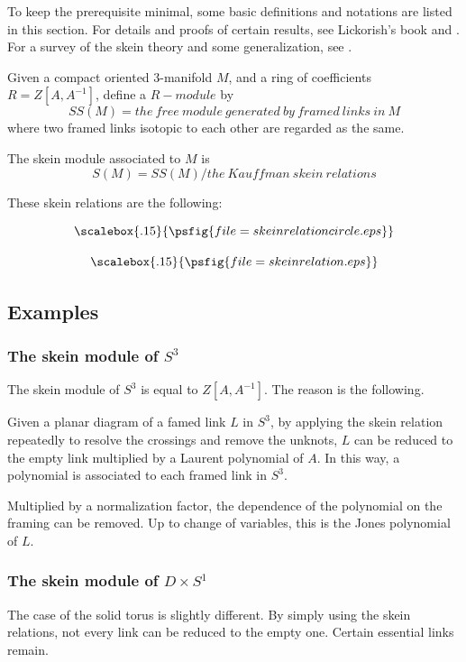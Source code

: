 

To keep the prerequisite minimal, some basic definitions and notations are listed in this section. For
details and proofs of certain results, see Lickorish's book \cite{LBook} and \cite{BHMV}. For a
survey of the skein theory and some generalization,
see \cite{LSurvey}.

Given a compact oriented 3-manifold $M$, and a ring of coefficients
$R=Z[A,A^{-1}]$, define a $R-module$ by
\[SS(M)=the\ free\ module\ generated\ by\ framed\ links\ in\ M\]
where two framed links isotopic to each other are regarded as the same.

\begin{definition} The skein module associated to $M$ is
\[S(M)= SS(M)/the\ Kauffman\ skein\ relations\]
\end{definition}

These skein relations are the following:

\[\scalebox{.15}{\psfig{file=skeinrelationcircle.eps}}\]


\[\scalebox{.15}{\psfig{file=skeinrelation.eps}}\]


\subsection{Examples}\label{examples}

\subsubsection{The skein module of $S^3$}\label{three sphere}
The skein module of $S^3$ is equal to $Z[A,A^{-1}]$. The reason is the following.

Given a planar diagram of a famed link $L$ in $S^3$, by applying the skein relation repeatedly to resolve the crossings and remove the unknots, $L$ can be reduced to the empty link multiplied by a Laurent polynomial of $A$. In this way, a polynomial is associated to each framed link in $S^3$.

Multiplied by a normalization factor, the dependence of the polynomial on the framing can be removed. Up to change of variables, this is the Jones polynomial of $L$.

\subsubsection{The skein module of $D\times S^1$}\label{solid torus}
The case of the solid torus is slightly different. By simply using the skein
relations, not every link can be reduced to the empty one. Certain
essential links remain.

